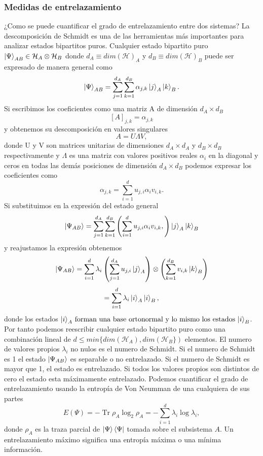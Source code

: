 \documentclass{article}
\DeclareMathOperator{\Tr}{Tr}
\theoremstyle{plain}
\theoremstyle{definition}
\begin{document}
	\subsubsection{Medidas de entrelazamiento}
	¿Como se puede cuantificar el grado de entrelazamiento entre dos sistemas?
	La descomposición de Schmidt es una de las herramientas más importantes para analizar estados bipartitos puros. Cualquier estado bipartito puro \(\ket{\Psi}_{AB} \in \mathcal{H}_A \otimes \mathcal{H}_B\) donde \(d_A\equiv dim(\mathcal{H})_A\) y \(d_B\equiv dim(\mathcal{H})_B\) puede ser expresado de manera general como \[\ket{\Psi}_{AB} = \sum_{j=1}^{d_A}\sum_{k=1}^{d_B} \alpha_{j,k} \ket{j}_A\ket{k}_B\text{.} \]
	Si escribimos los coeficientes como una matriz A de dimensión \(d_A\times d_B\)
	\[\left[A\right]_{j,k}= \alpha_{j,k}\] y obtenemos su descomposición en valores singulares \[A = U\Lambda V,\] donde U y V son matrices unitarias de dimensiones \(d_A\times d_A\) y \(d_B\times d_B\) respectivamente y  \(\Lambda\) es una matriz con valores positivos reales \(\alpha_i \) en la diagonal y ceros en todas las demás posiciones de dimensión \(d_A\times d_B\) podemos expresar los coeficientes como \[\alpha_{j,k} = \sum_{i=1}^{d}u_{j,i}\alpha_iv_{i,k}\text{.}  \] Si substituimos en la expresión del estado general \[\ket{\Psi_{AB}} = \sum_{j=1}^{d_A}\sum_{k=1}^{d_B}\left(\sum_{i=1}^{d}u_{j,i}\alpha_iv_{i,k}, \right) \ket{j}_A \ket{k}_B \] y reajustamos la expresión obtenemos \[\ket{\Psi_{AB}} = \sum_{i=1}^{d}\lambda_i \left(  \sum_{j=1}^{d_A}u_{j,i}\ket{j}_A\right) \otimes \left(\sum_{k=1}^{d_B}v_{i,k}\ket{k}_B \right) \] \[= \sum_{i=1}^{d}\lambda_i\ket{i}_A\ket{i}_B, \] donde los estados \({\ket{i}_A} \text{ forman una base ortonormal y lo mismo los estados } {\ket{i}_B }  \). Por tanto podemos reescribir cualquier estado bipartito puro como una combinación lineal de \(d \leq min \{ dim(\mathcal{H}_A), dim(\mathcal{H}_B\})\) elementos. El numero de valores propios \(\lambda_i \) no nulos es el numero de Schmidt. Si el numero de Schmidt es 1 el estado \(\ket{\Psi_{AB}}\) es separable o no entrelazado. Si el numero de Schmidt es mayor que 1, el estado es entrelazado. Si todos los valores propios son distintos de cero el estado esta máximamente entrelazado. Podemos cuantificar el grado de entrelazamiento   usando la entropía de Von Neumman de una cualquiera de sus partes \[E(\Psi) = -\Tr\rho_A\log_2\rho_A = - \sum_{i=1}^{d}\lambda_i \log\lambda_i, \] donde \(\rho_A\) es la traza parcial de \(\ket{\Psi}\bra{\Psi} \) tomada sobre el subsistema \(A\). Un entrelazamiento máximo significa una entropía máxima o una mínima información.
\end{document}

